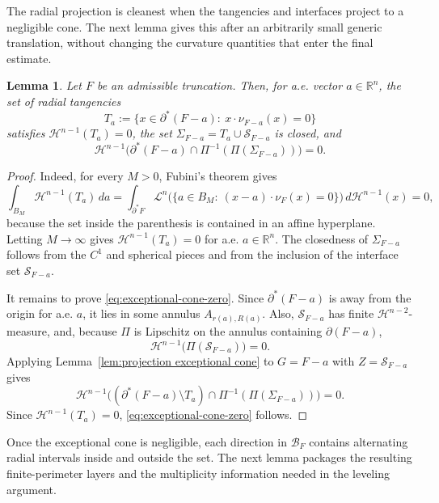 \documentclass[reqno,11pt]{amsart}
\makeatletter
\newcommand{\R}{\mathbb R}
\newcommand{\HH}{\mathscr H}
\newtheorem{lem}[thm]{Lemma}%
\numberwithin{equation}{section}
\theoremstyle{remark}
\makeatother
\begin{document}
The radial projection is cleanest when the tangencies and interfaces project to
a negligible cone. The next lemma gives this after an arbitrarily small generic
translation, without changing the curvature quantities that enter the final
estimate.

\begin{lem}\label{lem:generic-sigma}
Let $F$ be an admissible truncation. Then, for a.e. vector
$a\in\R^n$, the set of radial tangencies
\[
        T_a:=\{x\in\partial^*(F-a):\ x\cdot\nu_{F-a}(x)=0\}
\]
satisfies $\HH^{n-1}(T_a)=0$, the set
$\Sigma_{F-a}=T_a\cup\mathcal S_{F-a}$ is closed, and
\begin{equation}\label{eq:exceptional-cone-zero}
 \HH^{n-1}\big(\partial^* (F-a)\cap \Pi^{-1}(\Pi(\Sigma_{F-a}))\big)=0 .
\end{equation}
\end{lem}

\begin{proof}
Indeed, for every $M>0$, Fubini's theorem gives
\[
\int_{B_M}\HH^{n-1}(T_a)\,da
=\int_{\partial^*F}
\mathscr L^n\bigl(\{a\in B_M:\ (x-a)\cdot\nu_F(x)=0\}\bigr)
\,d\HH^{n-1}(x)=0,
\]
because the set inside the parenthesis is contained in an affine hyperplane.
Letting $M\to\infty$ gives $\HH^{n-1}(T_a)=0$ for a.e. $a\in\R^n$.
The closedness of $\Sigma_{F-a}$ follows from the $C^1$ and spherical pieces
and from the inclusion of the interface set $\mathcal S_{F-a}$.

It remains to prove \eqref{eq:exceptional-cone-zero}. Since $\partial^*(F-a)$ is
away from the origin for a.e. $a$, it lies in some annulus
$A_{r(a),R(a)}$. Also, $\mathcal S_{F-a}$ has finite $\HH^{n-2}$-measure, and,
because $\Pi$ is Lipschitz on the annulus containing $\partial(F-a)$,
\[
\HH^{n-1}\big(\Pi(\mathcal S_{F-a})\big)=0.
\]
Applying Lemma~\ref{lem:projection exceptional cone} to $G=F-a$ with
$Z=\mathcal S_{F-a}$ gives
\[
\HH^{n-1}\big((\partial^*(F-a)\setminus T_a)\cap
\Pi^{-1}(\Pi(\Sigma_{F-a}))\big)=0.
\]
Since $\HH^{n-1}(T_a)=0$, \eqref{eq:exceptional-cone-zero} follows.
\end{proof}

Once the exceptional cone is negligible, each direction in $\mathcal B_F$
contains alternating radial intervals inside and outside the set. The next
lemma packages the resulting finite-perimeter layers and the multiplicity
information needed in the leveling argument.
\end{document}
